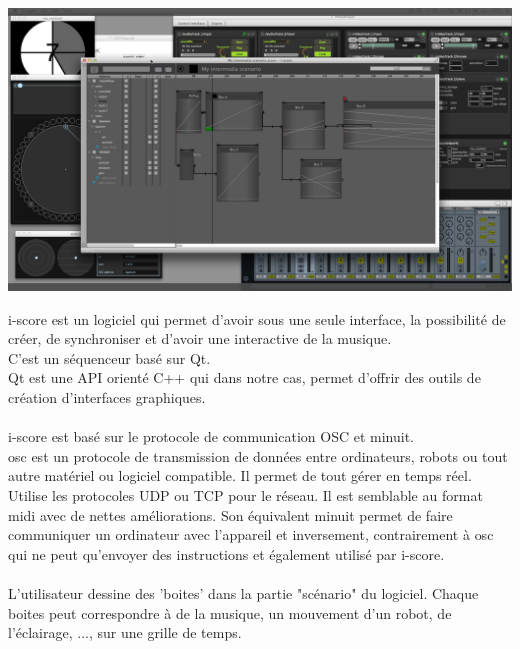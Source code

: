 \documentclass[10pt,a4paper]{report}
\begin{document}
\paragraph{}

\begin{center}
\includegraphics[scale=0.1]{image/iscore.jpg}
\end{center}

i-score est un logiciel qui permet d'avoir sous une seule interface, la possibilité de créer, de synchroniser et d'avoir une interactive de la musique.
\\
C'est un séquenceur basé sur Qt.\\
Qt est une API orienté C++ qui dans notre cas, permet d'offrir des outils de création d'interfaces graphiques.
\paragraph{}
i-score est basé sur le protocole de communication OSC et minuit.
\\
\acrfull{osc} est un protocole de transmission de données entre ordinateurs, robots ou tout autre matériel ou logiciel compatible. Il permet de tout gérer en temps réel. Utilise les protocoles UDP ou TCP pour le réseau. Il est semblable au format \acrfull{midi} avec de nettes améliorations. Son équivalent minuit permet de faire communiquer un ordinateur avec l'appareil et inversement, contrairement à \acrshort{osc} qui ne peut qu'envoyer des instructions et également utilisé par i-score.
\paragraph{}
L'utilisateur dessine des 'boites' dans la partie "scénario" du logiciel. Chaque boites peut correspondre à de la musique, un mouvement d'un robot, de l'éclairage, ..., sur une grille de temps.
\end{document}
